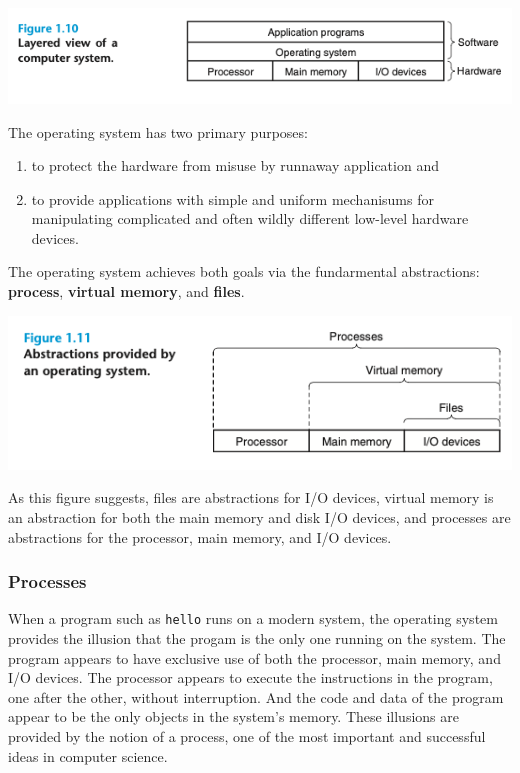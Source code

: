 \documentclass[11pt]{article}
\begin{document}
\begin{center}
\includegraphics[width=.9\linewidth]{pics/layered-view-of-a-computer-system.png}
\end{center}

The operating system has two primary purposes:\\
\begin{enumerate}
\item to protect the hardware from misuse by runnaway application and\\
\item to provide applications with simple and uniform mechanisums for manipulating complicated and often wildly different low-level hardware devices.\\
\end{enumerate}

The operating system achieves both goals via the fundarmental abstractions: \textbf{process}, \textbf{virtual memory}, and \textbf{files}.\\

\begin{center}
\includegraphics[width=.9\linewidth]{pics/abstractions-provided-by-an-operating-system.png}
\end{center}

As this figure suggests, files are abstractions for I/O devices, virtual memory is an abstraction for both the main memory and disk I/O devices, and processes are abstractions for the processor, main memory, and I/O devices.\\

\subsubsection{Processes}
\label{sec:org9c0656a}
When a program such as \texttt{hello} runs on a modern system, the operating system provides the illusion that the progam is the only one running on the system. The program appears to have exclusive use of both the processor, main memory, and I/O devices. The processor appears to execute the instructions in the program, one after the other, without interruption. And the code and data of the program appear to be the only objects in the system’s memory. These illusions are provided by the notion of a process, one of the most important and successful ideas in computer science.\\
\end{document}
